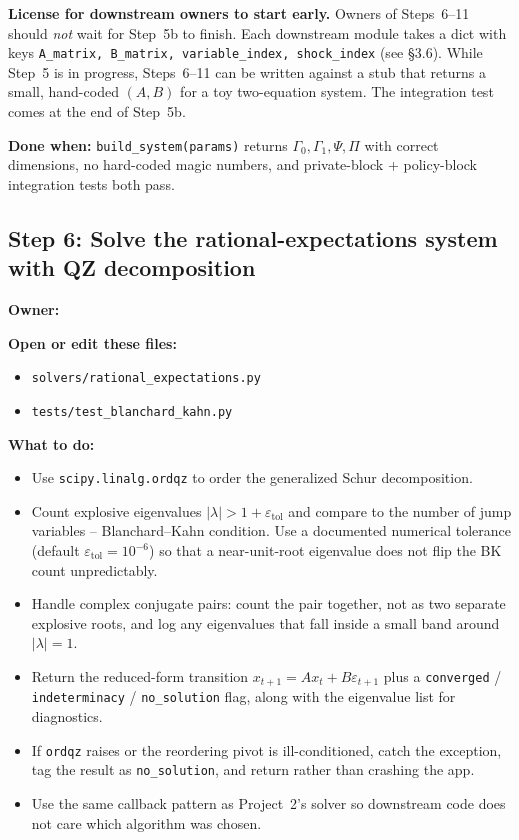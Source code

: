 \documentclass[11pt]{article}
\newcommand{\nameblank}{\underline{\hspace{4.5cm}}}
\begin{document}
\begin{notebox}
\textbf{License for downstream owners to start early.} Owners of Steps~6--11 should \emph{not} wait for Step~5b to finish. Each downstream module takes a dict with keys \texttt{A\_matrix, B\_matrix, variable\_index, shock\_index} (see \S3.6). While Step~5 is in progress, Steps~6--11 can be written against a stub that returns a small, hand-coded $(A, B)$ for a toy two-equation system. The integration test comes at the end of Step~5b.
\end{notebox}

\textbf{Done when:} \texttt{build\_system(params)} returns $\Gamma_0, \Gamma_1, \Psi, \Pi$ with correct dimensions, no hard-coded magic numbers, and private-block + policy-block integration tests both pass.

\subsection{Step 6: Solve the rational-expectations system with QZ decomposition}
\textbf{Owner:} \nameblank

\textbf{Open or edit these files:}
\begin{itemize}
    \item \texttt{solvers/rational\_expectations.py}
    \item \texttt{tests/test\_blanchard\_kahn.py}
\end{itemize}

\textbf{What to do:}
\begin{itemize}
    \item Use \texttt{scipy.linalg.ordqz} to order the generalized Schur decomposition.
    \item Count explosive eigenvalues $|\lambda|>1+\varepsilon_{\mathrm{tol}}$ and compare to the number of jump variables -- Blanchard--Kahn condition. Use a documented numerical tolerance (default $\varepsilon_{\mathrm{tol}}=10^{-6}$) so that a near-unit-root eigenvalue does not flip the BK count unpredictably.
    \item Handle complex conjugate pairs: count the pair together, not as two separate explosive roots, and log any eigenvalues that fall inside a small band around $|\lambda|=1$.
    \item Return the reduced-form transition $x_{t+1} = A x_t + B \varepsilon_{t+1}$ plus a \texttt{converged} / \texttt{indeterminacy} / \texttt{no\_solution} flag, along with the eigenvalue list for diagnostics.
    \item If \texttt{ordqz} raises or the reordering pivot is ill-conditioned, catch the exception, tag the result as \texttt{no\_solution}, and return rather than crashing the app.
    \item Use the same callback pattern as Project~2's solver so downstream code does not care which algorithm was chosen.
\end{itemize}
\end{document}
